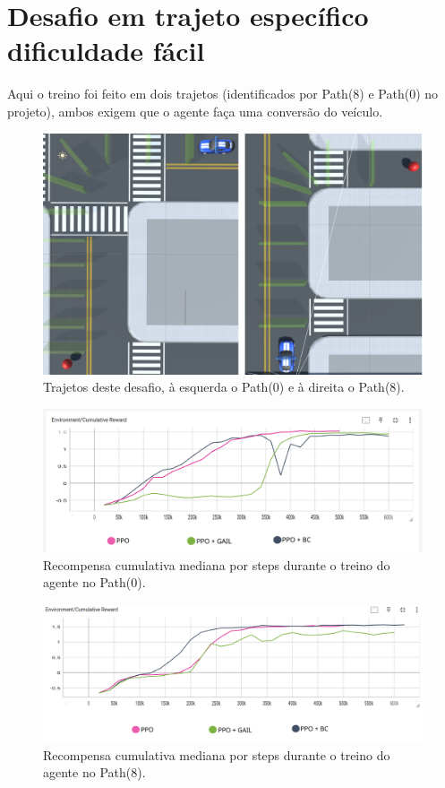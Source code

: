 \section{Desafio em trajeto específico dificuldade fácil}
Aqui o treino foi feito em dois trajetos (identificados por Path(8) e Path(0) no projeto), ambos exigem que o agente faça uma conversão do veículo.

\begin{figure}[h]
    \centering
    \includegraphics{figs/treinos/desafio-mediano/paths_0-8.png}
    \caption{Trajetos deste desafio, à esquerda o Path(0) e à direita o Path(8).}
\end{figure}

\begin{figure}[h]
    \centering
    \includegraphics[scale=0.42]{figs/treinos/desafio-mediano/path0/recompensa-ppo-bc-gail-path0.png}
    \caption{Recompensa cumulativa mediana por steps durante o treino do agente no Path(0).}
\end{figure}

\begin{figure}[h]
    \centering
    \includegraphics[scale=0.42]{figs/treinos/desafio-mediano/path8/recompensa-ppo-bc-gail-path8.png}
    \caption{Recompensa cumulativa mediana por steps durante o treino do agente no Path(8).}
\end{figure}

